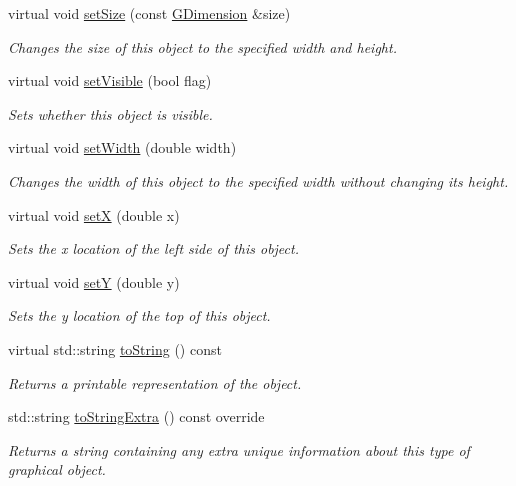 \begin{DoxyCompactItemize}
virtual void \mbox{\hyperlink{classsgl_1_1GObject_ae2b628228f192c2702c4ce941b2af68f}{set\+Size}} (const \mbox{\hyperlink{structsgl_1_1GDimension}{G\+Dimension}} \&size)
\begin{DoxyCompactList}\small\item\em Changes the size of this object to the specified width and height. \end{DoxyCompactList}\item 
virtual void \mbox{\hyperlink{classsgl_1_1GObject_a88203f28224315d9f4471212f4af8ed3}{set\+Visible}} (bool flag)
\begin{DoxyCompactList}\small\item\em Sets whether this object is visible. \end{DoxyCompactList}\item 
virtual void \mbox{\hyperlink{classsgl_1_1GObject_aa3f3fba4cb131baa8696ba01e3bceca1}{set\+Width}} (double width)
\begin{DoxyCompactList}\small\item\em Changes the width of this object to the specified width without changing its height. \end{DoxyCompactList}\item 
virtual void \mbox{\hyperlink{classsgl_1_1GObject_a9c18fcc579333bf9653d13ad2b372e39}{setX}} (double x)
\begin{DoxyCompactList}\small\item\em Sets the x location of the left side of this object. \end{DoxyCompactList}\item 
virtual void \mbox{\hyperlink{classsgl_1_1GObject_a7d57e2a5c35d27feb58fd498a3cf82b9}{setY}} (double y)
\begin{DoxyCompactList}\small\item\em Sets the y location of the top of this object. \end{DoxyCompactList}\item 
virtual std\+::string \mbox{\hyperlink{classsgl_1_1GObject_a1fe5121d6528fdea3f243321b3fa3a49}{to\+String}} () const
\begin{DoxyCompactList}\small\item\em Returns a printable representation of the object. \end{DoxyCompactList}\item 
std\+::string \mbox{\hyperlink{classsgl_1_1GRoundRect_a04364e674911906702b748deec32db18}{to\+String\+Extra}} () const override
\begin{DoxyCompactList}\small\item\em Returns a string containing any extra unique information about this type of graphical object. \end{DoxyCompactList}\end{DoxyCompactItemize}
